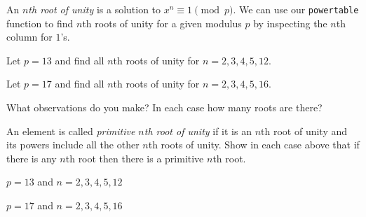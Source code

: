 \documentclass[12pt]{exam}
\begin{document}
\begin{questions}
  \question An \emph{$n$th root of unity} is a solution to $x^n\equiv1\pmod{p}$. We can use our \texttt{powertable} function to find $n$th roots of unity for a given modulus $p$ by inspecting the $n$th column for $1$'s.
  \begin{parts}
    \item Let $p=13$ and find all $n$th roots of unity for $n=2,3,4,5,12$. 
    \item Let $p=17$ and find all $n$th roots of unity for $n=2,3,4,5,16$.
    \item What observations do you make? In each case how many roots are there?
  \end{parts}
  \newpage
  \question An element is called \emph{primitive $n$th root of unity} if it is an $n$th root of unity  and its powers include all the other $n$th roots of unity. Show in each case above that if there is any $n$th root then there is a primitive $n$th root.
  \begin{parts}
    \item $p=13$ and $n=2,3,4,5,12$
    \item $p=17$ and $n=2,3,4,5,16$
  \end{parts}
  \newpage
  \question 
\end{questions}
\end{document}
